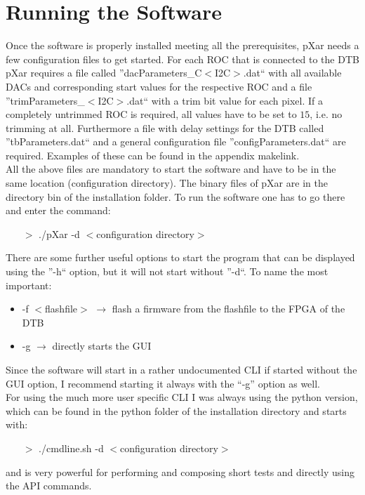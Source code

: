 \section{Running the Software}
Once the software is properly installed meeting all the prerequisites, pXar needs a few configuration files to get started. For each \ac{ROC} that is connected to the \ac{DTB} pXar requires a file called ''dacParameters\_C$<$\ac{I2C}$>$.dat`` with all available \ac{DAC}s and corresponding start values for the respective \ac{ROC} and a file ''trimParameters\_$<$\ac{I2C}$>$.dat`` with a trim bit value for each pixel. If a completely untrimmed \ac{ROC} is required, all values have to be set to $15$, i.e. no trimming at all. Furthermore a file with delay settings for the \ac{DTB} called ''tbParameters.dat`` and a general configuration file ''configParameters.dat`` are required. Examples of these can be found in the appendix \ac{makelink}.\\
All the above files are mandatory to start the software and have to be in the same location (configuration directory). The binary files of pXar are in the directory bin of the installation folder. To run the software one has to go there and enter the command:
\begin{itemize}
	\item[$>$] ./pXar -d $<$configuration directory$>$
\end{itemize}
There are some further useful options to start the program that can be displayed using the ''-h`` option, but it will not start without ''-d``. To name the most important:
\begin{itemize}
	\item -f $<$flashfile$>$ \ka $\rightarrow$ flash a firmware from the flashfile to the \ac{FPGA} of the \ac{DTB}
	\item -g \ka $\rightarrow$ directly starts the \ac{GUI}
\end{itemize}
Since the software will start in a rather undocumented \ac{CLI} if started without the \ac{GUI} option, I recommend starting it always with the ``-g'' option as well.\\
For using the much more user specific \ac{CLI} I was always using the python version, which can be found in the python folder of the installation directory and starts with:
\begin{itemize}
	\item[$>$] ./cmdline.sh -d $<$configuration directory$>$
\end{itemize}
and is very powerful for performing and composing short tests and directly using the \ac{API} commands.
